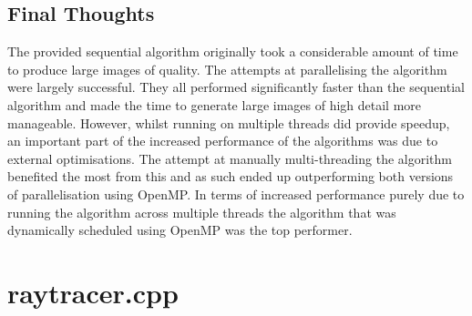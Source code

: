 \documentclass[journal,transmag]{IEEEtran}
\begin{document}
	\subsection{Final Thoughts}
	The provided sequential algorithm originally took a considerable amount of time to produce large images of quality. The attempts at parallelising the algorithm were largely successful. They all performed significantly faster than the sequential algorithm and made the time to generate large images of high detail more manageable. However, whilst running on multiple threads did provide speedup, an important part of the increased performance of the algorithms was due to external optimisations. The attempt at manually multi-threading the algorithm benefited the most from this and as such ended up outperforming both versions of parallelisation using OpenMP. In terms of increased performance purely due to running the algorithm across multiple threads the algorithm that was dynamically scheduled using OpenMP was the top performer.
	
	
	
	
	\newpage
	\onecolumn
	\appendices
	\section{raytracer.cpp}
	
	
\end{document}
